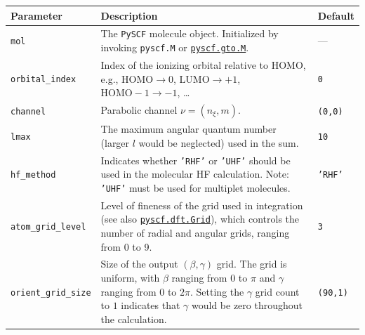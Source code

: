 \documentclass[preprint,12pt]{elsarticle} %
\renewcommand{\rm}[1]{\mathrm{#1}}    %
\begin{document}
\begin{table}[tb]
    \centering
    \begin{tabular}{l p{12cm} l}
        \hline \hline
        Parameter                   & Description                                                                                               & Default           \\
        \hline
        \texttt{mol}                & The \texttt{PySCF} molecule object. Initialized by invoking \texttt{pyscf.M} or
                                      \href{https://pyscf.org/pyscf_api_docs/pyscf.gto.html#module-pyscf.gto.mole}{\texttt{pyscf.gto.M}}.       & ---               \\
        \texttt{orbital\_index}     & Index of the ionizing orbital relative to HOMO, e.g., $\rm{HOMO} \rightarrow 0$,
                                      $\rm{LUMO} \rightarrow +1$, $\rm{HOMO-1} \rightarrow -1$, …                                               & \texttt{0}        \\
        \texttt{channel}            & Parabolic channel $\nu=(n_\xi, m)$.                                                                       & \texttt{(0,0)}    \\
        \texttt{lmax}               & The maximum angular quantum number (larger $l$ would be neglected) used in the sum.                       & \texttt{10}       \\
        \texttt{hf\_method}         & Indicates whether \texttt{'RHF'} or \texttt{'UHF'} should be used in the molecular HF calculation.
                                      Note: \texttt{'UHF'} must be used for multiplet molecules.                                                & \texttt{'RHF'}    \\
        \texttt{atom\_grid\_level}  & Level of fineness of the grid used in integration
                                      (see also \href{https://pyscf.org/pyscf_api_docs/pyscf.dft.html#module-pyscf.dft.gen_grid}{\texttt{pyscf.dft.Grid}}),
                                      which controls the number of radial and angular grids, ranging from 0 to 9.                               & \texttt{3}        \\
        \texttt{orient\_grid\_size} & Size of the output $(\beta,\gamma)$ grid.
                                      The grid is uniform, with $\beta$ ranging from $0$ to $\pi$ and $\gamma$ ranging from $0$ to $2\pi$.
                                      Setting the $\gamma$ grid count to $1$ indicates that $\gamma$ would be zero throughout the calculation.  & \texttt{(90,1)}   \\

\end{tabular}
\end{table}
\end{document}
